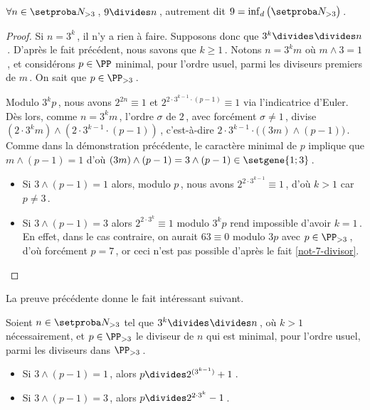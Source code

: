 

\begin{fact} \label{9-divisor}
	$\forall n \in \ourset_{>3}$\,, $9 \divides n$\,, autrement dit $9 = \dinf \big( \ourset_{>3} \big)$\,.
\end{fact}

\begin{proof}
	Si $n = 3^k$\,, il n'y a rien à faire. Supposons donc que $3^k \strictdivides n$\,. 
	D'après le fait précédent, nous savons que $k \geq 1$\,. Notons $n = 3^k m$ où $m \wedge 3 = 1$\,, et considérons $p\in\PP$ minimal, pour l'ordre usuel, parmi les diviseurs premiers de $m$\,. On sait que $p \in \PP_{>3}$\,.
	
	\medskip

	Modulo $3^k p$\,, nous avons
	$2^{2n} \equiv 1$
	et
	$2^{2 \cdot 3^{k-1} \cdot (p-1)} \equiv 1$
	via l'indicatrice d'Euler.
	Dès lors, comme $n = 3^k m$\,, l'ordre $\sigma$ de $2$\,, avec forcément $\sigma \neq 1$\,, divise 
	$(2 \cdot 3^k m) \wedge (2 \cdot 3^{k-1} \cdot (p-1))$\,,
	c'est-à-dire
	$2 \cdot 3^{k-1} \cdot \big( (3 m) \wedge (p-1) \big)$\,.
	Comme dans la démonstration précédente, le caractère minimal de $p$ implique que 
	$m \wedge (p-1) = 1$
	d'où
	$(3 m) \wedge (p-1) = 3 \wedge (p-1) \in \setgene{1 ; 3}$\,.
	\begin{itemize}
		\item Si $3 \wedge (p-1) = 1$ alors, modulo $p$\,,
		nous avons $2^{2 \cdot 3^{k-1}} \equiv 1$\,, d'où $k > 1$ car $p \neq 3$\,.

		\item Si $3 \wedge (p-1) = 3$ alors $2^{2 \cdot 3^k} \equiv 1$ modulo $3^k p$ rend impossible d'avoir $k = 1$\,.
		En effet, dans le cas contraire, on aurait $63 \equiv 0$ modulo $3 p$ avec $p \in \PP_{>3}$\,, d'où forcément $p = 7$\,,
		or ceci n'est pas possible d'après le fait \ref{not-7-divisor}.
	\end{itemize}
\end{proof}




La preuve précédente donne le fait intéressant suivant.


\begin{fact}
	Soient 
	$n \in \ourset_{>3}$ tel que $3^k \strictdivides n$\,, où $k > 1$ nécessairement,
	et
	$p \in \PP_{>3}$ le diviseur de $n$ qui est minimal, pour l'ordre usuel, parmi les diviseurs dans $\PP_{>3}$\,.
	\begin{itemize}
		\item Si $3 \wedge (p-1) = 1$\,, alors $p \divides 2^{(3^{k-1})} + 1$\,.

		\item Si $3 \wedge (p-1) = 3$\,, alors $p \divides 2^{2 \cdot 3^k} - 1$\,.
	\end{itemize}
\end{fact}


